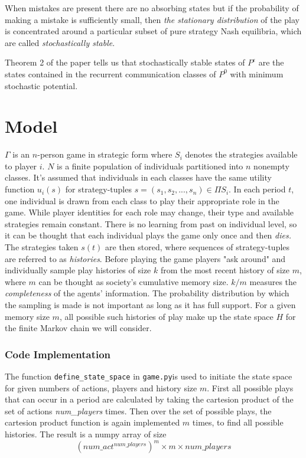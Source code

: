 \documentclass[11pt, a4paper, leqno]{article}
\begin{document}
When mistakes are present there are no absorbing states but if the probability of making a mistake
is sufficiently small, then \textit{the stationary distribution} of the play is concentrated around
a particular subset of pure strategy Nash equilibria, which are called \textit{stochastically stable}.

Theorem 2 of the paper tells us that stochastically stable states of $P^{\epsilon}$ are the states
contained in the recurrent communication classes of $P^0$ with minimum stochastic potential.

\section{Model} %
\label{sec:model}

$\Gamma$ is an $n$-person game in strategic form where $S_i$ denotes the strategies available to
player $i$. $N$ is a finite population of individuals partitioned into $n$ nonempty classes. It's
assumed that individuals in each classes have the same utility function $u_i(s)$ for strategy-tuples
$s=(s_1, s_2,...,s_n) \in \Pi S_i$. In each period $t$, one individual is drawn from each class to
play their appropriate role  in the game. While player identities for each role may change, their
type and available strategies remain constant. There is no learning from past on individual level,
so it can be thought that each individual plays the game only once and then \textit{dies.} The
strategies taken $s(t)$ are then stored, where sequences of strategy-tuples are referred to as
\textit{histories}. Before playing the game players "ask around" and individually sample play
histories of size $k$ from the most recent history of size $m$, where $m$ can be thought as
society's cumulative memory size. $k/m$ measures the \textit{completeness} of the agents' information.
The probability distribution by which the sampling is made is not important as long as it has
full support.  For a given memory size $m$, all possible such histories of play make up the
state space $H$ for the finite Markov chain we will consider.

\subsubsection*{Code Implementation}
The function \texttt{define\_state\_space} in \texttt{game.py}is used to initiate the state space for given numbers of
actions, players and history size $m$. First all possible plays that can occur in a period are
calculated by taking the cartesion product of the set of actions \textit{num\_players} times.
Then over the set of possible plays, the cartesion product function is again implemented $m$ times,
to find all possible histories. The result is a numpy array of size
\[(\textit{num\_act}^\textit{num\_players})^\textit{m} \times \textit{m} \times \textit{num\_players}\]
\end{document}
